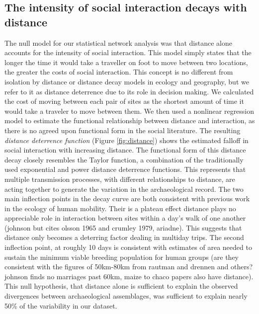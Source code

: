 \documentclass[fleqn,10pt]{wlscirep}
\begin{document}
\subsection*{The intensity of social interaction decays with distance}
The null model for our statistical network analysis was that distance alone accounts for the intensity of social interaction. This model simply states that the longer the time it would take a traveller on foot to move between two locations, the greater the costs of social interaction. This concept is no different from isolation by distance or distance decay models in ecology and geography, but we refer to it as distance deterrence due to its role in decision making. We calculated the cost of moving between each pair of sites as the shortest amount of time it would take a traveler to move between them. We then used a nonlinear regression model to estimate the functional relationship between distance and interaction, as there is no agreed upon functional form in the social literature. 
The resulting \textit{distance deterrence function} (Figure \ref{fig:distance}) shows the estimated falloff in social interaction with increasing distance. The functional form of this distance decay closely resembles the Taylor function, a combination of the traditionally used exponential and power distance deterrence functions. This represents that multiple transmission processes, with different relationships to distance, are acting together to generate the variation in the archaeological record. The two main inflection points in the decay curve are both consistent with previous work in the ecology of human mobility. Their is a plateau effect distance plays no appreciable role in interaction between sites within a day's walk of one another (johnson but cites olsson 1965 and crumley 1979, ariadne). This suggests that distance only becomes a deterring factor dealing in multiday trips. The second inflection point, at roughly 10 days is consistent with estimates of area needed to sustain the minimum viable breeding population for human groups (are they consistent with the figures of 50km-80km from rautman and drennen and others? johnson finds no marriages past 60km, maize to chaco papers also have distance). This null hypothesis, that distance alone is sufficient to explain the observed divergences between archaeological assemblages, was sufficient to explain nearly 50\% of the variability in our dataset.  

\end{document}
